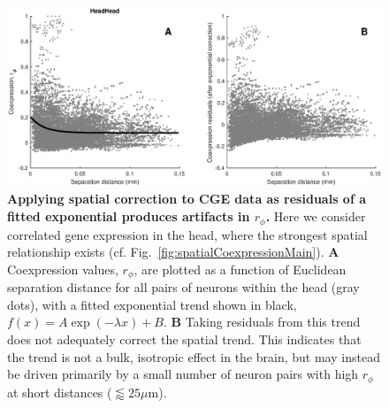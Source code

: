 \documentclass[10pt,letterpaper]{article}
\begin{document}
{%
\begin{figure}[h]
  \centering
    \includegraphics[width=.9\textwidth]{head_rphi_correct.eps}
  \caption{
  \textbf{Applying spatial correction to CGE data as residuals of a fitted exponential produces artifacts in $r_\phi$.}
  Here we consider correlated gene expression in the head, where the strongest spatial relationship exists (cf. Fig.~\ref{fig:spatialCoexpressionMain}).
  \textbf{A} Coexpression values, $r_\phi$, are plotted as a function of Euclidean separation distance for all pairs of neurons within the head (gray dots), with a fitted exponential trend shown in black, $f(x) = A\exp(-\lambda x) + B$.
    \textbf{B} Taking residuals from this trend does not adequately correct the spatial trend.
    This indicates that the trend is not a bulk, isotropic effect in the brain, but may instead be driven primarily by a small number of neuron pairs with high $r_\phi$ at short distances ($\lessapprox 25\mu$m).
    }
  \label{fig:S_head_rphi_correct}
\end{figure}





}
\end{document}
